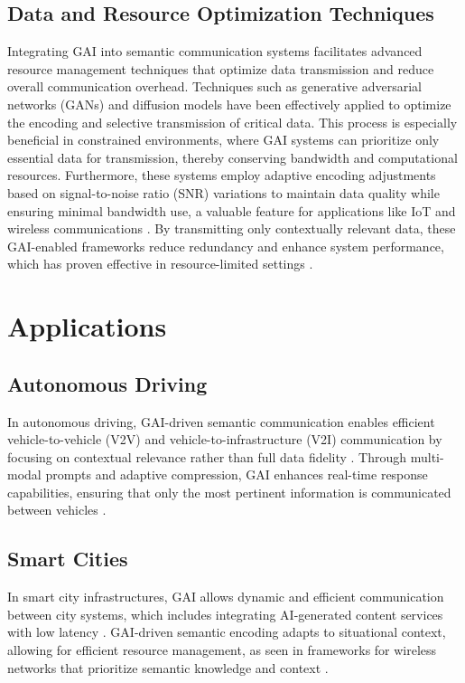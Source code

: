 \documentclass[journal]{IEEEtran}
\begin{document}
\subsection{Data and Resource Optimization Techniques}
Integrating GAI into semantic communication systems facilitates advanced resource management techniques that optimize data transmission and reduce overall communication overhead. Techniques such as generative adversarial networks (GANs) and diffusion models have been effectively applied to optimize the encoding and selective transmission of critical data. This process is especially beneficial in constrained environments, where GAI systems can prioritize only essential data for transmission, thereby conserving bandwidth and computational resources. Furthermore, these systems employ adaptive encoding adjustments based on signal-to-noise ratio (SNR) variations to maintain data quality while ensuring minimal bandwidth use, a valuable feature for applications like IoT and wireless communications \cite{liu2024semanticcommunicationsartificialintelligence}. By transmitting only contextually relevant data, these GAI-enabled frameworks reduce redundancy and enhance system performance, which has proven effective in resource-limited settings \cite{9797984,9953099}.


\section{Applications}

\subsection{Autonomous Driving}
In autonomous driving, GAI-driven semantic communication enables efficient vehicle-to-vehicle (V2V) and vehicle-to-infrastructure (V2I) communication by focusing on contextual relevance rather than full data fidelity \cite{raha2023generativeaidrivensemanticcommunication}. Through multi-modal prompts and adaptive compression, GAI enhances real-time response capabilities, ensuring that only the most pertinent information is communicated between vehicles \cite{10447237}.

\subsection{Smart Cities}
In smart city infrastructures, GAI allows dynamic and efficient communication between city systems, which includes integrating AI-generated content services with low latency \cite{10614204}. GAI-driven semantic encoding adapts to situational context, allowing for efficient resource management, as seen in frameworks for wireless networks that prioritize semantic knowledge and context \cite{bariah2023largegenerativeaimodels}.
\end{document}

